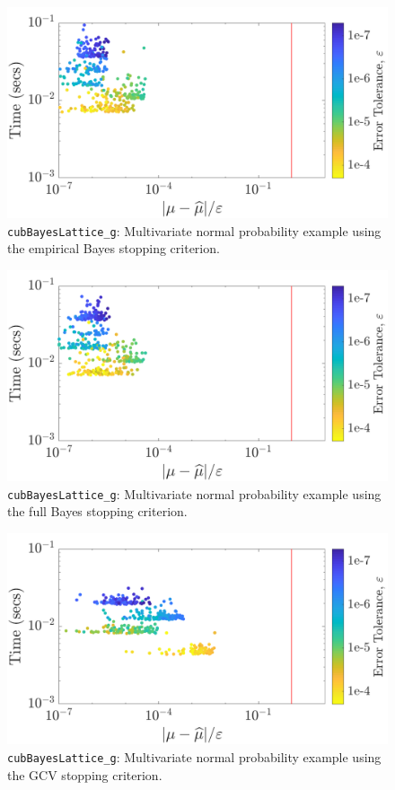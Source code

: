 \documentclass{iitthesis}          %
\newcommand{\code}[1]{\texttt{#1}}
\begin{document}
\begin{figure}
	\centering
	\includegraphics[width=0.95\linewidth]{"Lattice/Lattice_MVN_guaranteed_time_MLE_C2sin_d2_r2_2019-Jun-27"}
	\caption[Lattice: MVN guaranteed: MLE]{\code{cubBayesLattice\_g}: Multivariate normal probability example using the empirical Bayes stopping criterion.}
	\label{fig:mvn-guaranteed-MLE}
\end{figure}
\begin{figure}
	\centering
	\includegraphics[width=0.95\linewidth]{"Lattice/Lattice_MVN_guaranteed_time_full_C2sin_d2_r2_2019-Jun-27"}
	\caption[Lattice: MVN guaranteed: Full Bayes]{\code{cubBayesLattice\_g}: Multivariate normal probability example using the full Bayes stopping criterion.}
	\label{fig:mvn-guaranteed-FB}
\end{figure}
\begin{figure}
	\centering
	\includegraphics[width=0.95\linewidth]{"Lattice/Lattice_MVN_guaranteed_time_GCV_C2sin_d2_r2_2019-Jun-27"}
	\caption[Lattice: MVN guaranteed: GCV]{\code{cubBayesLattice\_g}: Multivariate normal probability example using the GCV stopping criterion.}
	\label{fig:mvn-guaranteed-GCV}
\end{figure}
\end{document}
